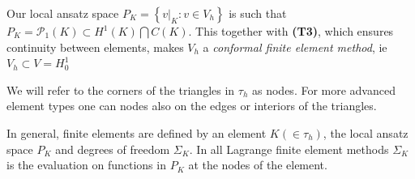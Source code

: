 \documentclass[../Main/main.tex]{subfiles}
\begin{document}
	\begin{remark}
	Our local ansatz space $P_K = \left \{ v|_K:v\in V_h \right \}$ is such that $P_K = \mathcal{P}_1(K) \subset H^1(K) \bigcap C(K)$. This together with \textbf{(T3)}, which ensures continuity between elements, makes $V_h$ a \emph{conformal finite element method}, ie $V_h \subset V = H_0^1$
	\end{remark}
	\begin{remark}[Nodes]
		We will refer to the corners of the triangles in $\tau_h$ as nodes. For more advanced element types one can nodes also on the edges or interiors of the triangles.
	\end{remark}
	\begin{remark}
		In general, finite elements are defined by an element $K(\in \tau_h)$, the local ansatz space $P_K$ and degrees of freedom $\Sigma_K$. In all Lagrange finite element methods $\Sigma_K$ is the evaluation on functions in $P_K$ at the nodes of the element.
	\end{remark}
\end{document}
